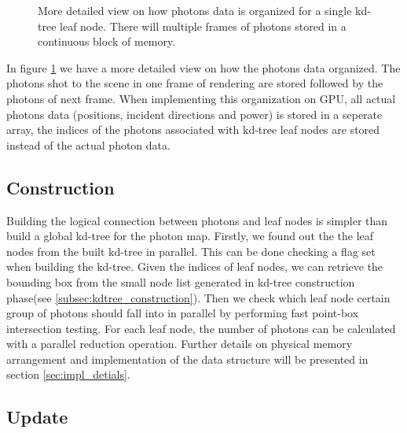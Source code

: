 \begin{figure}
    \centering
    \renewcommand{\thefigure}{\thechapter.\arabic{figure}}
    \caption[Detailed view on organization of photons data for a single leaf node]{More detailed view on how photons data is organized for a single kd-tree leaf node. There will multiple frames of photons stored in a continuous block of memory.}
    \label{fig:kd_leaf_photons_2}
\end{figure}

In figure \ref{fig:kd_leaf_photons_2} we have a more detailed view on how the photons data organized. The photons shot to the scene in one frame of rendering are stored followed by the photons of next frame. When implementing this organization on GPU, all actual photons data (positions, incident directions and power) is stored in a seperate array, the indices of the photons associated with kd-tree leaf nodes are stored instead of the actual photon data. 

\subsection{Construction} 

Building the logical connection between photons and leaf nodes is simpler than build a global kd-tree for the photon map. Firstly, we found out the the leaf nodes from the built kd-tree in parallel. This can be done checking a flag set when building the kd-tree. Given the indices of leaf nodes, we can retrieve the bounding box from the small node list generated in kd-tree construction phase(see \ref{subsec:kdtree_construction}). Then we check which leaf node certain group of photons should fall into in parallel by performing fast point-box intersection testing. For each leaf node, the number of photons can be calculated with a parallel reduction operation. Further details on physical memory arrangement and implementation of the data structure  will be presented in section \ref{sec:impl_detials}. 

\subsection{Update}

